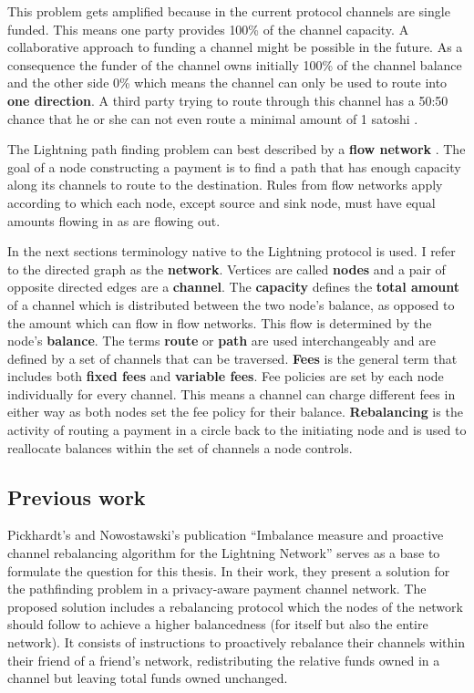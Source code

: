 \documentclass[final]{fhnwreport}       %
\begin{document}
This problem gets amplified because in the current protocol channels are single funded. This means one party provides 100\% of the channel capacity. A collaborative approach to funding a channel might be possible in the future. As a consequence the funder of the channel owns initially 100\% of the channel balance and the other side 0\% which means the channel can only be used to route into \textbf{one direction}. A third party trying to route through this channel has a 50:50 chance that he or she can not even route a minimal amount of 1 satoshi . 

The Lightning path finding problem can best described by a \textbf{flow network} . The goal of a node constructing a payment is to find a path that has enough capacity along its channels to route to the destination. Rules from flow networks apply according to which each node, except source and sink node, must have equal amounts flowing in as are flowing out. 

In the next sections terminology native to the Lightning protocol is used. I refer to the directed graph as the \textbf{network}. Vertices are called \textbf{nodes} and a pair of opposite directed edges are a \textbf{channel}. The \textbf{capacity} defines the \textbf{total amount} of a channel which is distributed between the two node's balance, as opposed to the amount which can flow in flow networks. This flow is determined by the node's \textbf{balance}. The terms \textbf{route} or \textbf{path} are used interchangeably and are defined by a set of channels that can be traversed. \textbf{Fees} is the general term that includes both \textbf{fixed fees} and \textbf{variable fees}. Fee policies are set by each node individually for every channel. This means a channel can charge different fees in either way as both nodes set the fee policy for their balance. \textbf{Rebalancing} is the activity of routing a payment in a circle back to the initiating node and is used to reallocate balances within the set of channels a node controls.   

\subsection{Previous work}
Pickhardt's and Nowostawski's publication ``Imbalance measure and proactive channel rebalancing algorithm for the Lightning Network'' \citep{pickhardt_imbalance_2019} serves as a base to formulate the question for this thesis. In their work, they present a solution for the pathfinding problem in a privacy-aware payment channel network. The proposed solution includes a rebalancing protocol which the nodes of the network should follow to achieve a higher balancedness (for itself but also the entire network). It consists of instructions to proactively rebalance their channels within their friend of a friend's network, redistributing the relative funds owned in a channel but leaving total funds owned unchanged.
\end{document}
